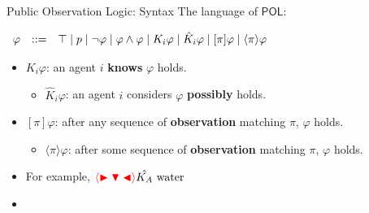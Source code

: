 \documentclass[usenames,dvipsnames]{beamer}
\newcommand\ldiaarg[1]{\langle#1\rangle}
\newcommand{\POL}{\mathsf{POL}}
\newcommand{\ep}{\ensuremath{\varepsilon}}
\newcommand{\obsright}{\blacktriangleright}
\newcommand{\obsleft}{\blacktriangleleft}
\newcommand{\obsdown}{\blacktriangledown}
\renewcommand{\phi}{\varphi}
\begin{document}
    
\begin{frame}{Public Observation Logic: Syntax\footnotemark[1]}
The language of $\POL$:
\vspace{.1cm}
			
		     $\begin{array}{r@{\quad::= \quad}l}
				\phi  &
				\top
				\mid
				p
				\mid \neg \phi
				\mid \phi \land \phi
				\mid K_i\phi
				\mid \hat{K}_i \phi
				\mid [\pi] \phi
				\mid \ldiaarg{\pi} \phi
			\end{array}$
			
			\vspace{.1cm}
    \begin{itemize}
        \item $K_i\varphi$: an agent $i$ \textbf{knows} $\varphi$ holds.
        \vspace{.1cm}
        \begin{itemize}
            \item $\hat{K}_i\phi$: an agent $i$ considers $\varphi$ \textbf{possibly} holds.
        \end{itemize}
        \vspace{.1cm}
        \item $[\pi]\varphi$: after any sequence of \textbf{observation} matching $\pi$, $\varphi$ holds.
        \vspace{.1cm}
        \begin{itemize}
            \item $\ldiaarg{\pi}\phi$: after some sequence of \textbf{observation} matching $\pi$, $\varphi$ holds.
        \end{itemize}
        \vspace{.1cm}
        \item For example, $\textcolor{red}{\ldiaarg{\obsright\obsdown\obsleft}}\hat{K_A} \textrm{ water }$
    
    \item[]
    

\end{itemize}
\end{frame}
\end{document}

